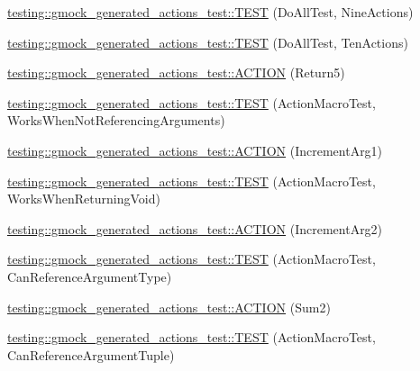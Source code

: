 \begin{DoxyCompactItemize}
\item 
\mbox{\hyperlink{namespacetesting_1_1gmock__generated__actions__test_ae2037cf34f7bbdb2aa779f31f44c0530}{testing\+::gmock\+\_\+generated\+\_\+actions\+\_\+test\+::\+T\+E\+ST}} (Do\+All\+Test, Nine\+Actions)
\item 
\mbox{\hyperlink{namespacetesting_1_1gmock__generated__actions__test_a11cc35bfa98278915c040aac2329b4a7}{testing\+::gmock\+\_\+generated\+\_\+actions\+\_\+test\+::\+T\+E\+ST}} (Do\+All\+Test, Ten\+Actions)
\item 
\mbox{\hyperlink{namespacetesting_1_1gmock__generated__actions__test_a1275b0757e9f1caf70fbc23da141acd3}{testing\+::gmock\+\_\+generated\+\_\+actions\+\_\+test\+::\+A\+C\+T\+I\+ON}} (Return5)
\item 
\mbox{\hyperlink{namespacetesting_1_1gmock__generated__actions__test_a6a73da775945f4294d9377b0110bb237}{testing\+::gmock\+\_\+generated\+\_\+actions\+\_\+test\+::\+T\+E\+ST}} (Action\+Macro\+Test, Works\+When\+Not\+Referencing\+Arguments)
\item 
\mbox{\hyperlink{namespacetesting_1_1gmock__generated__actions__test_a960f5a5ca2b6a95ce1f3f1673b90d02d}{testing\+::gmock\+\_\+generated\+\_\+actions\+\_\+test\+::\+A\+C\+T\+I\+ON}} (Increment\+Arg1)
\item 
\mbox{\hyperlink{namespacetesting_1_1gmock__generated__actions__test_accde1673541c5076b0e09b3f1914c9d2}{testing\+::gmock\+\_\+generated\+\_\+actions\+\_\+test\+::\+T\+E\+ST}} (Action\+Macro\+Test, Works\+When\+Returning\+Void)
\item 
\mbox{\hyperlink{namespacetesting_1_1gmock__generated__actions__test_aa2c56f5c6a770b252ebdc27a6d8b613d}{testing\+::gmock\+\_\+generated\+\_\+actions\+\_\+test\+::\+A\+C\+T\+I\+ON}} (Increment\+Arg2)
\item 
\mbox{\hyperlink{namespacetesting_1_1gmock__generated__actions__test_abdfd8146dfbb5a152326a851b13e45cb}{testing\+::gmock\+\_\+generated\+\_\+actions\+\_\+test\+::\+T\+E\+ST}} (Action\+Macro\+Test, Can\+Reference\+Argument\+Type)
\item 
\mbox{\hyperlink{namespacetesting_1_1gmock__generated__actions__test_a108b4ee75c3b13445b7035fd5ecd6d6d}{testing\+::gmock\+\_\+generated\+\_\+actions\+\_\+test\+::\+A\+C\+T\+I\+ON}} (Sum2)
\item 
\mbox{\hyperlink{namespacetesting_1_1gmock__generated__actions__test_a4e2d8b9ac63b2f6dc6d4b17c3a767dee}{testing\+::gmock\+\_\+generated\+\_\+actions\+\_\+test\+::\+T\+E\+ST}} (Action\+Macro\+Test, Can\+Reference\+Argument\+Tuple)
\item 

\end{DoxyCompactItemize}
